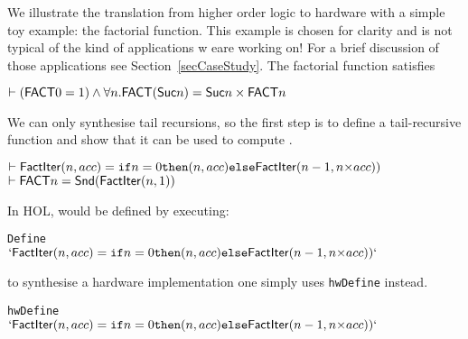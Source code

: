 \documentclass{llncs}
\begin{document}
We illustrate the translation from higher order logic to hardware with a
simple toy example: the factorial function. This example is chosen for
clarity and is not typical of the kind of
applications w eare working on!  For a brief discussion of those
applications see Section~\ref{secCaseStudy}.
The factorial function  satisfies

\vspace*{-1mm}

{\baselineskip10pt\begin{alltt}
 \(\vdash (\DEF{FACT} 0 = 1) \wedge {\forall}n. \DEF{FACT}(\DEF{Suc} n) = \DEF{Suc} n \times \DEF{FACT} n\)
\end{alltt}}

\vspace*{-2mm}
We can only synthesise tail recursions, so the first
step is to define a tail-recursive function  and show
that it can be used to compute .

\vspace*{-2mm}

{\baselineskip14pt\begin{alltt}
\( \vdash \DEF{FactIter}(n,acc) = \texttt{if} n=0 \texttt{then} (n,acc) \texttt{else} \DEF{FactIter}(n-1,n{\times}acc)) \)
\( \vdash \DEF{FACT} n = \DEF{Snd}(\DEF{FactIter}(n,1)) \)
\end{alltt}}

\vspace*{-2mm}

\noindent In HOL,  would be defined by executing:

\vspace*{-2mm}

{\baselineskip10pt\begin{alltt}
 Define
\(  `\DEF{FactIter}(n,acc) = \texttt{if} n=0 \texttt{then} (n,acc) \texttt{else} \DEF{FactIter}(n-1,n{\times}acc))`\)
\end{alltt}}

\vspace*{-2mm}

\noindent to synthesise a hardware implementation one simply uses
\texttt{hwDefine} instead.

\vspace*{-2mm}


{\baselineskip10pt\begin{alltt}
 hwDefine
\(  `\DEF{FactIter}(n,acc) = \texttt{if} n=0 \texttt{then} (n,acc) \texttt{else} \DEF{FactIter}(n-1,n{\times}acc))`\)
\end{alltt}}
\end{document}
